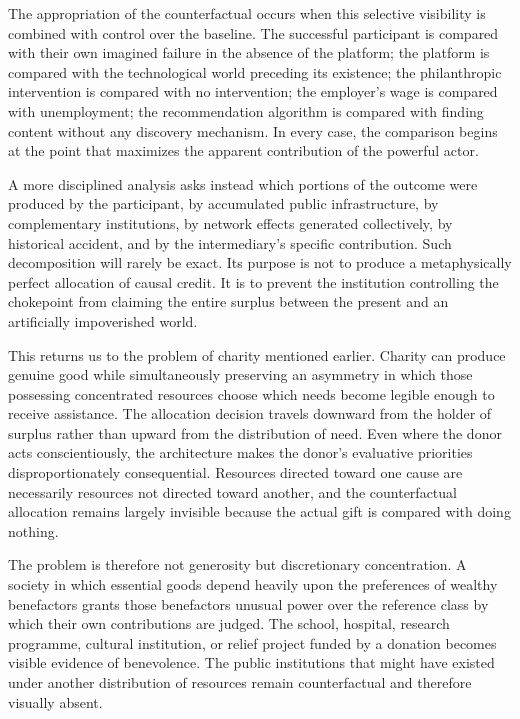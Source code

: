 \documentclass[11pt]{article}
\begin{document}
The appropriation of the counterfactual occurs when this selective visibility is combined with control over the baseline. The successful participant is compared with their own imagined failure in the absence of the platform; the platform is compared with the technological world preceding its existence; the philanthropic intervention is compared with no intervention; the employer's wage is compared with unemployment; the recommendation algorithm is compared with finding content without any discovery mechanism. In every case, the comparison begins at the point that maximizes the apparent contribution of the powerful actor.

A more disciplined analysis asks instead which portions of the outcome were produced by the participant, by accumulated public infrastructure, by complementary institutions, by network effects generated collectively, by historical accident, and by the intermediary's specific contribution. Such decomposition will rarely be exact. Its purpose is not to produce a metaphysically perfect allocation of causal credit. It is to prevent the institution controlling the chokepoint from claiming the entire surplus between the present and an artificially impoverished world.

This returns us to the problem of charity mentioned earlier. Charity can produce genuine good while simultaneously preserving an asymmetry in which those possessing concentrated resources choose which needs become legible enough to receive assistance. The allocation decision travels downward from the holder of surplus rather than upward from the distribution of need. Even where the donor acts conscientiously, the architecture makes the donor's evaluative priorities disproportionately consequential. Resources directed toward one cause are necessarily resources not directed toward another, and the counterfactual allocation remains largely invisible because the actual gift is compared with doing nothing.

The problem is therefore not generosity but discretionary concentration. A society in which essential goods depend heavily upon the preferences of wealthy benefactors grants those benefactors unusual power over the reference class by which their own contributions are judged. The school, hospital, research programme, cultural institution, or relief project funded by a donation becomes visible evidence of benevolence. The public institutions that might have existed under another distribution of resources remain counterfactual and therefore visually absent.
\end{document}
